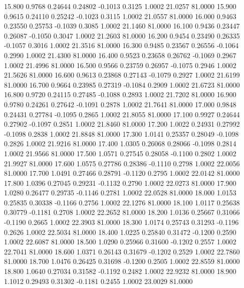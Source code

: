   15.800   0.9768   0.24644   0.24802  -0.1013   0.3125   1.0002  21.0257  81.0000
  15.900   0.9615   0.24110   0.25242  -0.1023   0.3115   1.0002  21.0557  81.0000
  16.000   0.9463   0.23550   0.25753  -0.1039   0.3085   1.0002  21.1460  81.0000
  16.100   0.9436   0.23447   0.26087  -0.1050   0.3047   1.0002  21.2603  81.0000
  16.200   0.9454   0.23490   0.26335  -0.1057   0.3016   1.0002  21.3516  81.0000
  16.300   0.9485   0.23567   0.26556  -0.1064   0.2990   1.0002  21.4300  81.0000
  16.400   0.9523   0.23658   0.26762  -0.1069   0.2967   1.0002  21.4996  81.0000
  16.500   0.9566   0.23759   0.26957  -0.1075   0.2946   1.0002  21.5626  81.0000
  16.600   0.9613   0.23868   0.27143  -0.1079   0.2927   1.0002  21.6199  81.0000
  16.700   0.9664   0.23985   0.27319  -0.1084   0.2909   1.0002  21.6723  81.0000
  16.800   0.9720   0.24115   0.27485  -0.1088   0.2893   1.0002  21.7202  81.0000
  16.900   0.9780   0.24261   0.27642  -0.1091   0.2878   1.0002  21.7641  81.0000
  17.000   0.9848   0.24431   0.27784  -0.1095   0.2865   1.0002  21.8055  81.0000
  17.100   0.9927   0.24644   0.27902  -0.1097   0.2851   1.0002  21.8460  81.0000
  17.200   1.0022   0.24931   0.27992  -0.1098   0.2838   1.0002  21.8848  81.0000
  17.300   1.0141   0.25357   0.28049  -0.1098   0.2826   1.0002  21.9216  81.0000
  17.400   1.0305   0.26068   0.28066  -0.1098   0.2814   1.0002  21.9566  81.0000
  17.500   1.0571   0.27545   0.28058  -0.1100   0.2802   1.0002  21.9927  81.0000
  17.600   1.0575   0.27786   0.28386  -0.1110   0.2798   1.0002  22.0056  81.0000
  17.700   1.0491   0.27466   0.28791  -0.1120   0.2795   1.0002  22.0142  81.0000
  17.800   1.0396   0.27045   0.29231  -0.1132   0.2790   1.0002  22.0273  81.0000
  17.900   1.0280   0.26477   0.29735  -0.1146   0.2781   1.0002  22.0528  81.0000
  18.000   1.0153   0.25835   0.30338  -0.1166   0.2756   1.0002  22.1276  81.0000
  18.100   1.0117   0.25638   0.30779  -0.1181   0.2708   1.0002  22.2652  81.0000
  18.200   1.0136   0.25667   0.31066  -0.1190   0.2665   1.0002  22.3903  81.0000
  18.300   1.0174   0.25743   0.31293  -0.1196   0.2626   1.0002  22.5034  81.0000
  18.400   1.0225   0.25840   0.31472  -0.1200   0.2590   1.0002  22.6087  81.0000
  18.500   1.0290   0.25966   0.31600  -0.1202   0.2557   1.0002  22.7041  81.0000
  18.600   1.0371   0.26143   0.31679  -0.1202   0.2529   1.0002  22.7860  81.0000
  18.700   1.0476   0.26425   0.31698  -0.1200   0.2505   1.0002  22.8559  81.0000
  18.800   1.0640   0.27034   0.31582  -0.1192   0.2482   1.0002  22.9232  81.0000
  18.900   1.1012   0.29493   0.31302  -0.1181   0.2455   1.0002  23.0029  81.0000
